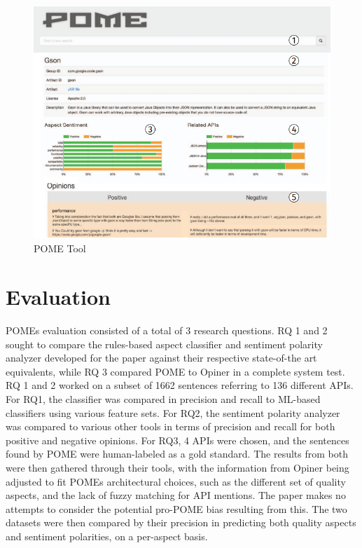 \documentclass[a4paper,10pt, bibliography=totocnumbered]{scrreprt}
\begin{document}
\begin{figure}[!h]
    \centering
    \includegraphics[scale=0.6]{../images/Thema9_POMETool.PNG}
    \caption{POME Tool}
    \label{POMETool}
\end{figure}

\pagebreak

\section{Evaluation}

POMEs evaluation consisted of a total of 3 research questions. RQ 1 and 2 sought to compare the rules-based aspect classifier and sentiment polarity analyzer developed for the paper against their respective state-of-the art equivalents, while RQ 3 compared POME to Opiner in a complete system test. RQ 1 and 2 worked on a subset of 1662 sentences referring to 136 different APIs. For RQ1, the classifier was compared in precision and recall to ML-based classifiers using various feature sets. For RQ2, the sentiment polarity analyzer was compared to various other tools in terms of precision and recall for both positive and negative opinions. For RQ3, 4 APIs were chosen, and the sentences found by POME were human-labeled as a gold standard. The results from both were then gathered through their tools, with the information from Opiner being adjusted to fit POMEs architectural choices, such as the different set of quality aspects, and the lack of fuzzy matching for API mentions. The paper makes no attempts to consider the potential pro-POME bias resulting from this. The two datasets were then compared by their precision in predicting both quality aspects and sentiment polarities, on a per-aspect basis.
\end{document}
